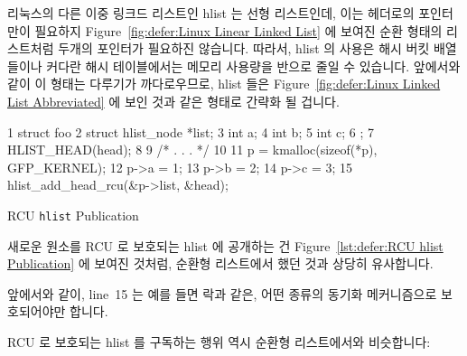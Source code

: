 리눅스의 다른 이중 링크드 리스트인 hlist 는 선형 리스트인데, 이는 헤더로의
포인터만이 필요하지
Figure~\ref{fig:defer:Linux Linear Linked List} 에 보여진 순환 형태의
리스트처럼 두개의 포인터가 필요하진 않습니다.
따라서, hlist 의 사용은 해시 버킷 배열들이나 커다란 해시 테이블에서는 메모리
사용량을 반으로 줄일 수 있습니다.
앞에서와 같이 이 형태는 다루기가 까다로우므로, hlist 들은
Figure~\ref{fig:defer:Linux Linked List Abbreviated} 에 보인 것과 같은 형태로
간략화 될 겁니다.

\begin{listing}[tbp]
{ \scriptsize
\begin{verbbox}
  1 struct foo {
  2   struct hlist_node *list;
  3   int a;
  4   int b;
  5   int c;
  6 };
  7 HLIST_HEAD(head);
  8
  9 /* . . . */
 10
 11 p = kmalloc(sizeof(*p), GFP_KERNEL);
 12 p->a = 1;
 13 p->b = 2;
 14 p->c = 3;
 15 hlist_add_head_rcu(&p->list, &head);
\end{verbbox}
}
\centering
\theverbbox
\caption{RCU {\tt hlist} Publication}
\label{lst:defer:RCU hlist Publication}
\end{listing}

새로운 원소를 RCU 로 보호되는 hlist 에 공개하는 건
Figure~\ref{lst:defer:RCU hlist Publication} 에 보여진 것처럼,
순환형 리스트에서 했던 것과 상당히 유사합니다.

앞에서와 같이, line~15 는 예를 들면 락과 같은, 어떤 종류의 동기화 메커니즘으로
보호되어야만 합니다.

RCU 로 보호되는 hlist 를 구독하는 행위 역시 순환형 리스트에서와 비슷합니다:

